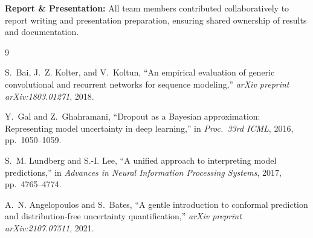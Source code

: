 \documentclass[12pt,a4paper]{article}
\begin{document}
\vspace{0.8em}
\begin{notebox}
\textbf{Report \& Presentation:} All team members contributed collaboratively to report writing and presentation preparation, ensuring shared ownership of results and documentation.
\end{notebox}

\begin{thebibliography}{9}

S.~Bai, J.~Z. Kolter, and V.~Koltun,
``An empirical evaluation of generic convolutional and recurrent networks for sequence modeling,''
\textit{arXiv preprint arXiv:1803.01271}, 2018.

Y.~Gal and Z.~Ghahramani,
``Dropout as a Bayesian approximation: Representing model uncertainty in deep learning,''
in \textit{Proc.\ 33rd ICML}, 2016, pp.~1050--1059.

S.~M. Lundberg and S.-I. Lee,
``A unified approach to interpreting model predictions,''
in \textit{Advances in Neural Information Processing Systems}, 2017, pp.~4765--4774.

A.~N. Angelopoulos and S.~Bates,
``A gentle introduction to conformal prediction and distribution-free uncertainty quantification,''
\textit{arXiv preprint arXiv:2107.07511}, 2021.

\end{thebibliography}
\end{document}
